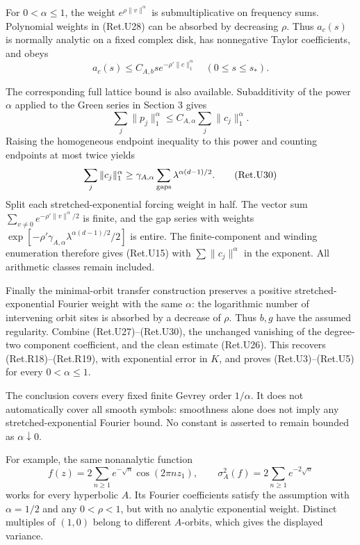 For \(0<\alpha\le1\), the weight \(e^{\rho\|v\|^\alpha}\) is
submultiplicative on frequency sums. Polynomial weights in (Ret.U28)
can be absorbed by decreasing \(\rho\). Thus \(a_c(s)\) is normally
analytic on a fixed complex disk, has nonnegative Taylor
coefficients, and obeys
\[
                a_c(s)\le C_{A,b}s e^{-\rho'\|c\|_1^\alpha}
                        \quad(0\le s\le s_*).            \tag{Ret.U29}
\]

The corresponding full lattice bound is also available.
Subadditivity of the power \(\alpha\) applied to the Green series
in Section 3 gives
\[
 \sum_j\|p_j\|_1^\alpha
                   \le C_{A,\alpha}\sum_j\|c_j\|_1^\alpha.
\]
Raising the homogeneous endpoint inequality to this power and
counting endpoints at most twice yields
\[
 \sum_j\|c_j\|_1^\alpha
       \ge\gamma_{A,\alpha}
                 \sum_{\rm gaps}\lambda^{\alpha(d-1)/2}. \tag{Ret.U30}
\]
Split each stretched-exponential forcing weight in half. The vector
sum \(\sum_{v\ne0}e^{-\rho'\|v\|^\alpha/2}\) is finite, and the gap
series with weights
\(\exp[-\rho'\gamma_{A,\alpha}\lambda^{\alpha(d-1)/2}/2]\)
is entire. The finite-component and winding enumeration therefore
gives (Ret.U15) with \(\sum\|c_j\|^\alpha\) in the exponent.
All arithmetic classes remain included.

Finally the minimal-orbit transfer construction preserves a positive
stretched-exponential Fourier weight with the same \(\alpha\):
the logarithmic number of intervening orbit sites is absorbed by a
decrease of \(\rho\). Thus \(b,g\) have the assumed regularity.
Combine (Ret.U27)--(Ret.U30), the unchanged vanishing of the degree-two
component coefficient, and the clean estimate (Ret.U26).
This recovers (Ret.R18)--(Ret.R19), with exponential error in \(K\), and
proves (Ret.U3)--(Ret.U5) for every \(0<\alpha\le1\).

The conclusion covers every fixed finite Gevrey order \(1/\alpha\).
It does not automatically cover all smooth symbols: smoothness alone
does not imply any stretched-exponential Fourier bound.
No constant is asserted to remain bounded as \(\alpha\downarrow0\).

For example, the same nonanalytic function
\[
 f(z)=2\sum_{n\ge1}e^{-\sqrt n}\cos(2\pi nz_1),\qquad
                 \sigma_A^2(f)=2\sum_{n\ge1}e^{-2\sqrt n} \tag{Ret.U31}
\]
works for every hyperbolic \(A\). Its Fourier coefficients satisfy the
assumption with \(\alpha=1/2\) and any \(0<\rho<1\), but with no
analytic exponential weight. Distinct multiples of \((1,0)\)
belong to different \(A\)-orbits, which gives the displayed variance.

